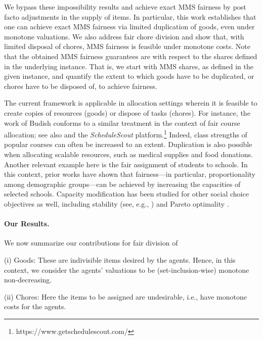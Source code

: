 We bypass these impossibility results and achieve exact MMS fairness by post facto adjustments in the supply of items. In particular, this work establishes that one can achieve exact MMS fairness via limited duplication of goods, even under monotone valuations. We also address fair chore division and show that, with limited disposal of chores, MMS fairness is feasible under monotone costs. Note that the obtained MMS fairness guarantees are with respect to the shares defined in the underlying instance. That is, we start with MMS shares, as defined in the given instance, and quantify the extent to which goods have to be duplicated, or chores have to be disposed of, to achieve fairness. 

The current framework is applicable in allocation settings wherein it is feasible to create copies of resources (goods) or dispose of tasks (chores). For instance, the work of Budish \cite{7c65302b-f079-361a-94f1-0c3c9f6fc76b} conforms to a similar treatment in the context of fair course allocation; see also \cite{budish2017course} and the {\it ScheduleScout} platform.\footnote{{https://www.getschedulescout.com/}} Indeed, class strengths of popular courses can often be increased to an extent. Duplication is also possible when allocating scalable resources, such as medical supplies and food donations. Another relevant example here is the fair assignment of students to schools. In this context, prior works \cite{procaccia2024school, santhini2024approximation} have shown that fairness---in particular, proportionality among demographic groups---can be achieved by increasing the capacities of selected schools. Capacity modification has been studied for other social choice objectives as well, including stability (see, e.g., \cite{nguyen2018near,gokhale2024capacity}) and Pareto optimality \cite{kumano2022quota}.  


\paragraph{Our Results.} 
We now summarize our contributions for fair division of 

\noindent
(i) Goods: These are indivisible items desired by the agents. Hence, in this context, we consider the agents' valuations to be (set-inclusion-wise) monotone non-decreasing.  

\noindent
(ii) Chores: Here the items to be assigned are undesirable, i.e., have monotone costs for the agents. 

